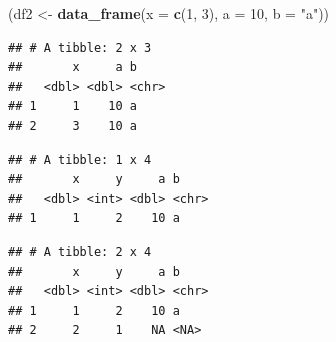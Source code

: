 \documentclass[]{book}
\newenvironment{Shaded}{\begin{snugshade}}{\end{snugshade}}
\newcommand{\CommentTok}[1]{\textcolor[rgb]{0.56,0.35,0.01}{\textit{#1}}}
\newcommand{\DataTypeTok}[1]{\textcolor[rgb]{0.13,0.29,0.53}{#1}}
\newcommand{\DecValTok}[1]{\textcolor[rgb]{0.00,0.00,0.81}{#1}}
\newcommand{\KeywordTok}[1]{\textcolor[rgb]{0.13,0.29,0.53}{\textbf{#1}}}
\newcommand{\NormalTok}[1]{#1}
\newcommand{\OperatorTok}[1]{\textcolor[rgb]{0.81,0.36,0.00}{\textbf{#1}}}
\newcommand{\StringTok}[1]{\textcolor[rgb]{0.31,0.60,0.02}{#1}}
\theoremstyle{definition}
\theoremstyle{definition}
\theoremstyle{definition}
\theoremstyle{remark}
\begin{document}
\begin{Shaded}
\begin{Highlighting}[]
\NormalTok{(df2 <-}\StringTok{ }\KeywordTok{data_frame}\NormalTok{(}\DataTypeTok{x =} \KeywordTok{c}\NormalTok{(}\DecValTok{1}\NormalTok{, }\DecValTok{3}\NormalTok{), }\DataTypeTok{a =} \DecValTok{10}\NormalTok{, }\DataTypeTok{b =} \StringTok{"a"}\NormalTok{))}
\end{Highlighting}
\end{Shaded}

\begin{verbatim}
## # A tibble: 2 x 3
##       x     a b    
##   <dbl> <dbl> <chr>
## 1     1    10 a    
## 2     3    10 a
\end{verbatim}

\begin{Shaded}
\end{Shaded}

\begin{verbatim}
## # A tibble: 1 x 4
##       x     y     a b    
##   <dbl> <int> <dbl> <chr>
## 1     1     2    10 a
\end{verbatim}

\begin{Shaded}
\end{Shaded}

\begin{verbatim}
## # A tibble: 2 x 4
##       x     y     a b    
##   <dbl> <int> <dbl> <chr>
## 1     1     2    10 a    
## 2     2     1    NA <NA>
\end{verbatim}

\begin{Shaded}
\end{Shaded}
\end{document}
